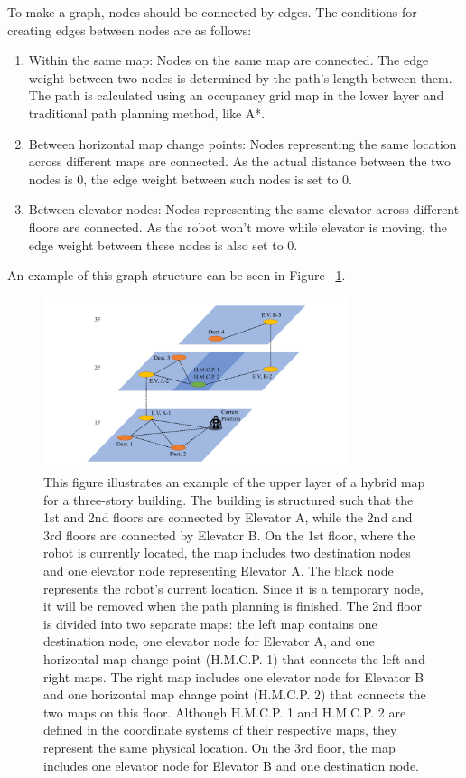 \documentclass[en]{snu-cse-bsc-thesis}
\begin{document}
To make a graph, nodes should be connected by edges. The conditions for creating edges between nodes are as follows:
\begin{enumerate}
  \item Within the same map: Nodes on the same map are connected. The edge weight between two nodes is determined by the path's length between them. The path is calculated using an occupancy grid map in the lower layer and traditional path planning method, like A*.
  \item Between horizontal map change points: Nodes representing the same location across different maps are connected. As the actual distance between the two nodes is 0, the edge weight between such nodes is set to 0.
  \item Between elevator nodes: Nodes representing the same elevator across different floors are connected. As the robot won't move while elevator is moving, the edge weight between these nodes is also set to 0.
\end{enumerate}
An example of this graph structure can be seen in Figure ~\ref{fig:graph_outline}.
\begin{figure}[!t]
  \centering
  \includegraphics[width=0.8\textwidth]{gcg graph outline.pdf}
  \caption{This figure illustrates an example of the upper layer of a hybrid map for a three-story building. The building is structured such that the 1st and 2nd floors are connected by Elevator A, while the 2nd and 3rd floors are connected by Elevator B. On the 1st floor, where the robot is currently located, the map includes two destination nodes and one elevator node representing Elevator A. The black node represents the robot's current location. Since it is a temporary node, it will be removed when the path planning is finished. The 2nd floor is divided into two separate maps: the left map contains one destination node, one elevator node for Elevator A, and one horizontal map change point (H.M.C.P. 1) that connects the left and right maps. The right map includes one elevator node for Elevator B and one horizontal map change point (H.M.C.P. 2) that connects the two maps on this floor. Although H.M.C.P. 1 and H.M.C.P. 2 are defined in the coordinate systems of their respective maps, they represent the same physical location. On the 3rd floor, the map includes one elevator node for Elevator B and one destination node.}
  \label{fig:graph_outline}
\end{figure}
\end{document}
